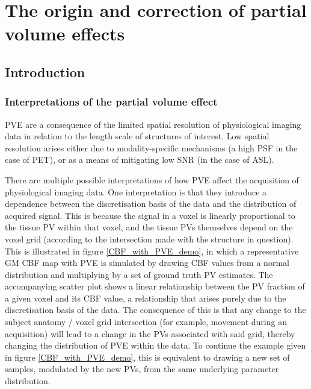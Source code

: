  

\chapter{The origin and correction of partial volume effects}
\label{pvec_chapter}

\section{Introduction}
\subsection{Interpretations of the partial volume effect}

PVE are a consequence of the limited spatial resolution of physiological imaging data in relation to the length scale of structures of interest. Low spatial resolution arises either due to modality-specific mechanisms (a high PSF in the case of PET), or as a means of mitigating low SNR (in the case of ASL). 

There are multiple possible interpretations of how PVE affect the acquisition of physiological imaging data. One interpretation is that they introduce a dependence between the discretisation basis of the data and the distribution of acquired signal. This is because the signal in a voxel is linearly proportional to the tissue PV within that voxel, and the tissue PVs themselves depend on the voxel grid (according to the intersection made with the structure in question). This is illustrated in figure \ref{CBF_with_PVE_demo}, in which a representative GM CBF map with PVE is simulated by drawing CBF values from a normal distribution and multiplying by a set of ground truth PV estimates. The accompanying scatter plot shows a linear relationship between the PV fraction of a given voxel and its CBF value, a relationship that arises purely due to the discretisation basis of the data. The consequence of this is that any change to the subject anatomy / voxel grid intersection (for example, movement during an acquisition) will lead to a change in the PVs associated with said grid, thereby changing the distribution of PVE within the data. To continue the example given in figure \ref{CBF_with_PVE_demo}, this is equivalent to drawing a new set of samples, modulated by the new PVs, from the same underlying parameter distribution.

